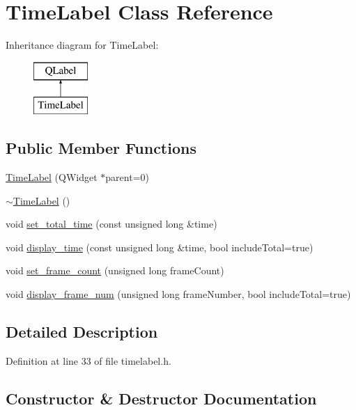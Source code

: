 \hypertarget{classTimeLabel}{}\section{Time\+Label Class Reference}
\label{classTimeLabel}
Inheritance diagram for Time\+Label\+:\begin{figure}[H]
\begin{center}
\leavevmode
\includegraphics[height=2.000000cm]{classTimeLabel}
\end{center}
\end{figure}
\subsection*{Public Member Functions}
\begin{DoxyCompactItemize}
\item 
\hyperlink{classTimeLabel_ab5209722b07e051d8f491cd15a16d3a6}{Time\+Label} (Q\+Widget $\ast$parent=0)
\item 
\hyperlink{classTimeLabel_adf063e3753ec3518e8b2fb5ff3eed9e7}{$\sim$\+Time\+Label} ()
\item 
void \hyperlink{classTimeLabel_adcce5f44f60d58312c0a566b3dd0bf77}{set\+\_\+total\+\_\+time} (const unsigned long \&time)
\item 
void \hyperlink{classTimeLabel_a77ac5dbff384d73f672ef00dade79a54}{display\+\_\+time} (const unsigned long \&time, bool include\+Total=true)
\item 
void \hyperlink{classTimeLabel_a177fc7aff1b4257b947a9a174cd82362}{set\+\_\+frame\+\_\+count} (unsigned long frame\+Count)
\item 
void \hyperlink{classTimeLabel_ab92bd43ecd75617d5b5a187db72ed44b}{display\+\_\+frame\+\_\+num} (unsigned long frame\+Number, bool include\+Total=true)
\end{DoxyCompactItemize}


\subsection{Detailed Description}


Definition at line 33 of file timelabel.\+h.



\subsection{Constructor \& Destructor Documentation}
\hypertarget{classTimeLabel_ab5209722b07e051d8f491cd15a16d3a6}{}
